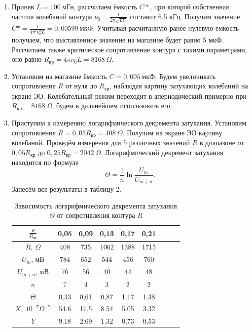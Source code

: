\documentclass[a4paper,12pt]{article}
\begin{document}
 
	\begin{enumerate}
		\item Приняв $L=100~\text{мГн}$, рассчитаем ёмкость $C*$, при которой собственная частота колебаний контура $\nu_0=\frac{1}{2\pi\sqrt{LC}}$ составит 6.5 кГц. Получим значение $C* =\frac{1}{4\pi^2\nu_0^2L}=0,00599~\text{мкФ}$. Учитывая расчитанную ранее нулевую емкость получаем, что выставленное значение на магазине будет равно 5 мкФ. Рассчитаем также критическое сопротивление контура с такими параметрами, оно равно $R_{\text{кр}}=4\pi\nu_0L=8168~\Omega$.
  
  \item Установим на магазине ёмкость $C=0,005~\text{мкФ}$. Будем увеличивать сопротивление $R$ от нуля до $R_{\text{кр}}$, наблюдая картину затухающих колебаний на экране ЭО. Колебательный режим переходит в апериодический примерно при $R_{\text{кр}}=8168~\Omega$, будем в дальнейшем использовать его.

  \item Приступим к измерению логарифмического декремента затухания. Установим сопротивление $R=0,05R_{\text{кр}}=408~\Omega$. Получим на экране ЭО картину колебаний. Проведём измерения для 5 различных значений $R$ в диапазоне от $0,05R_{\text{кр}}$ до $0,25R_{\text{кр}}=2042~\Omega$. Логарифмический декремент затухания находится по формуле\[\Theta=\frac{1}{n}\ln{\frac{U_m}{U_{m+n}}}.\] Занесём все результаты в таблицу 2.

  \begin{table}[h]
	\centering
	\begin{tabular}{|c|c|c|c|c|c|c|c|c|}
		\hline
		$\frac{R}{R_{\text{кр}}}$ & 0,05 & 0,09 & 0,13 & 0,17 & 0,21\\ \hline
		$R,\ \Omega$ & 408 & 735 & 1062 & 1388 & 1715 \\ \hline
		$U_m$, мВ & 784 & 652 & 544 & 456 & 760 \\ \hline
		$U_{m+n}$, мВ & 76 & 56 & 40 & 44 & 48 \\ \hline
		$n$ & 7 & 4 & 3 & 2 & 2  \\ \hline
		$\Theta$ & 0,33 & 0,61 & 0,87 & 1.17 & 1.38 \\ \hline
  $X,\ 10^{-7}\Omega^{-2}$ & 54.6 & 17.5 & 8.54 & 5.05 & 3.32\\ \hline
  $Y$ & 9.18 & 2.69 & 1.32 & 0,73 & 0,53 \\ \hline
	\end{tabular}
 \caption{Зависимость логарифмического декремента затухания $\Theta$ от сопротивления контура $R$} \label{decr}
\end{table}


\end{enumerate}
\end{document}
